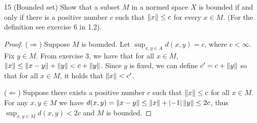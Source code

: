 \begin{exercise}{15 (Bounded set)}
Show that a subset $M$ in a normed space $X$ is bounded if and only if there is a positive number $c$ such that $\left\lVert x\right\rVert\leq c$ for every $x\in M$. (For the definition see exercise 6 in 1.2).
\end{exercise}
\begin{proof}
($\Rightarrow$) Suppose $M$ is bounded. Let $\sup_{x,y\in A}d(x,y)=c$, where $c<\infty$. Fix $y\in M$. From exercise 3, we have that for all $x\in M$, $\left\lVert x\right\rVert\leq \left\lVert x-y\right\rVert+\left\lVert y\right\rVert <c+\left\lVert y\right\rVert$. Since $y$ is fixed, we can define $c'=c+\left\lVert y\right\rVert$ so that for all $x\in M$, it holds that $\left\lVert x\right\rVert<c'$.

($\Leftarrow$) Suppose there exists a positive number $c$ such that $\left\lVert x\right\rVert\leq c$ for all $x\in M$. For any $x,y\in M$ we have $d(x,y)=\left\lVert x-y\right\rVert \leq\left\lVert x\right\rVert+\left\lvert -1\right\rvert\left\lVert y\right\rVert\leq 2c$, thus $\sup_{x,y\in M}d(x,y)<2c$ and $M$ is bounded.
\end{proof}
